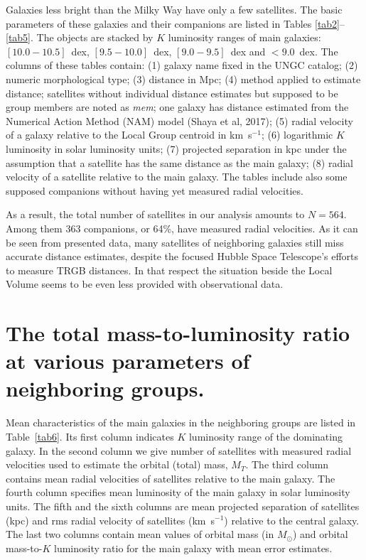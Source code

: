 \documentclass[proof]{WileyASNA-v1}
\begin{document}
Galaxies less bright than the Milky Way have only a few satellites. The basic
parameters of these galaxies and their companions are listed in Tables
\ref{tab2}--\ref{tab5}. The objects are stacked by $K$ luminosity ranges of main
galaxies: $[10.0-10.5]$~dex, $[9.5-10.0]$~dex, $[9.0-9.5]$~dex and $<9.0$~dex.
The columns of these tables contain: (1) galaxy name fixed in the UNGC catalog;
(2) numeric morphological type; (3) distance in Mpc; (4) method applied to
estimate distance; satellites without individual distance estimates but supposed
to be group members are noted as {\itshape mem}; one galaxy has distance
estimated from the Numerical Action Method (NAM) model (Shaya et al, 2017); (5)
radial velocity of a galaxy relative to the Local Group centroid in km~s$^{-1}$;
(6) logarithmic $K$ luminosity in solar luminosity units; (7) projected
separation in kpc under the assumption that a satellite has the same distance as
the main galaxy; (8) radial velocity of a satellite relative to the main galaxy.
The tables include also some supposed companions without having yet measured
radial velocities.

As a result, the total number of satellites in our analysis amounts to $N =
564$. Among them 363 companions, or 64\%, have measured radial velocities. As it
can be seen from presented data, many satellites of neighboring galaxies still
miss accurate distance estimates, despite the focused Hubble Space Telescope's
efforts to measure TRGB distances. In that respect the situation beside the
Local Volume seems to be even less provided with observational data.

\section{The total mass-to-luminosity ratio at various parameters of neighboring
groups.}\label{sec3}

Mean characteristics of the main galaxies in the neighboring groups are listed
in Table~\ref{tab6}. Its first column indicates $K$ luminosity range of the
dominating galaxy. In the second column we give number of satellites with
measured radial velocities used to estimate the orbital (total) mass, $M_T$. The
third column contains mean radial velocities of satellites relative to the main
galaxy. The fourth column specifies mean luminosity of the main galaxy in solar
luminosity units. The fifth and the sixth columns are mean projected separation
of satellites (kpc) and  rms radial velocity of satellites (km~s$^{-1}$)
relative to the central galaxy. The last two columns contain mean values of
orbital mass (in $M_{\odot}$) and orbital mass-to-$K$ luminosity ratio for the
main galaxy with mean error estimates.
\end{document}
